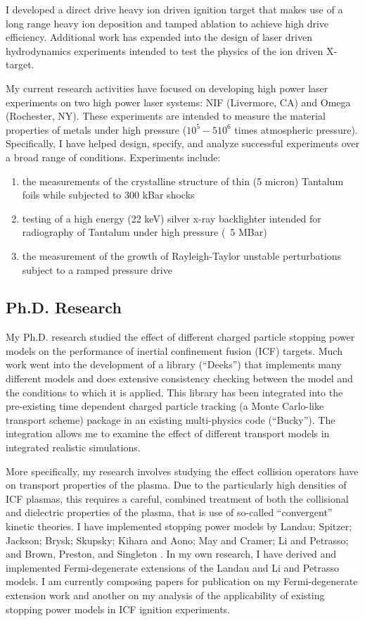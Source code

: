 \documentclass[letterpaper,11pt]{article}
\begin{document}
I developed a direct drive heavy ion driven ignition target that makes use of a
long range heavy ion deposition and tamped ablation to achieve high drive
efficiency.  Additional work has expended into the design of laser driven
hydrodynamics experiments intended to test the physics of the ion driven
X-target.

My current research activities have focused on developing high power laser
experiments on two high power laser systems: NIF (Livermore, CA) and Omega
(Rochester, NY).  These experiments are intended to measure the material
properties of metals under high pressure ($10^5 - 5 10^6$ times atmospheric
pressure).  Specifically, I have helped design, specify, and analyze successful
experiments over a broad range of conditions.  Experiments include:
\begin{enumerate}
	\item the measurements of the crystalline structure of thin (5 micron)
		Tantalum foils while subjected to 300 kBar shocks
	\item testing of a high energy (22 keV) silver x-ray backlighter intended for
		radiography of Tantalum under high pressure (~5 MBar)
	\item the measurement of the growth of Rayleigh-Taylor unstable
		perturbations subject to a ramped pressure drive
\end{enumerate}


\subsection*{Ph.D. Research}
My Ph.D. research studied the effect of different charged particle stopping
power models on the performance of inertial confinement fusion (ICF) targets.
Much work went into the development of a library (``Deeks'') that implements
many different models and does extensive consistency checking between the model
and the conditions to which it is applied.  This library has been integrated
into the pre-existing time dependent charged particle tracking (a Monte
Carlo-like transport scheme) package in an existing multi-physics code
(``Bucky'').  The integration allows me to examine the effect of different
transport models in integrated realistic simulations.

\vspace{0.1in}

More specifically, my research involves studying the effect collision operators have on transport properties of the plasma.  Due to the particularly high densities of ICF plasmas, this requires a careful, combined treatment of both the collisional and dielectric properties of the plasma, that is use of so-called ``convergent'' kinetic theories.  I have implemented stopping power models by 
Landau; 
Spitzer; 
Jackson; 
Brysk; 
Skupsky; 
Kihara and Aono; 
May and Cramer; 
Li and Petrasso; 
and 
Brown, Preston, and Singleton%
.
In my own research, I have derived and implemented Fermi-degenerate extensions of the Landau and Li and Petrasso models.  I am currently composing papers for publication on my Fermi-degenerate extension work and another on my analysis of the applicability of existing stopping power models in ICF ignition experiments.  
\end{document}
